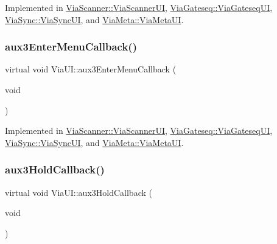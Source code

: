 Implemented in \mbox{\hyperlink{class_via_scanner_1_1_via_scanner_u_i_a7d3aad2399479925618df242bc5b1f42}{Via\+Scanner\+::\+Via\+Scanner\+UI}}, \mbox{\hyperlink{class_via_gateseq_1_1_via_gateseq_u_i_a8e700657f1fe190238eca7c46541337b}{Via\+Gateseq\+::\+Via\+Gateseq\+UI}}, \mbox{\hyperlink{class_via_sync_1_1_via_sync_u_i_a117e57feaf74b2619c1506aacc421721}{Via\+Sync\+::\+Via\+Sync\+UI}}, and \mbox{\hyperlink{class_via_meta_1_1_via_meta_u_i_a2d1e0164ad7d84c410cc90cefe9730ce}{Via\+Meta\+::\+Via\+Meta\+UI}}.

\mbox{\label{class_via_u_i_aa62c9f8dc58d37fc2a3abc7bce1cd16e}} 
\subsubsection{\texorpdfstring{aux3\+Enter\+Menu\+Callback()}{aux3EnterMenuCallback()}}
{\footnotesize\ttfamily virtual void Via\+U\+I\+::aux3\+Enter\+Menu\+Callback (\begin{DoxyParamCaption}\item[{void}]{ }\end{DoxyParamCaption})\hspace{0.3cm}{\ttfamily [pure virtual]}}



Implemented in \mbox{\hyperlink{class_via_scanner_1_1_via_scanner_u_i_ade6dc0e93911fe51731bffa65990599a}{Via\+Scanner\+::\+Via\+Scanner\+UI}}, \mbox{\hyperlink{class_via_gateseq_1_1_via_gateseq_u_i_a8235806bb28a40062b89b1cb9c83e3b0}{Via\+Gateseq\+::\+Via\+Gateseq\+UI}}, \mbox{\hyperlink{class_via_sync_1_1_via_sync_u_i_a66f7a9ccbfff3b1b1ba32fe775808703}{Via\+Sync\+::\+Via\+Sync\+UI}}, and \mbox{\hyperlink{class_via_meta_1_1_via_meta_u_i_a31f9a7e08ee2d77d7aa96b644369e92d}{Via\+Meta\+::\+Via\+Meta\+UI}}.

\mbox{\label{class_via_u_i_a9ea505dfd800b261beabe8dc47b201d3}} 
\subsubsection{\texorpdfstring{aux3\+Hold\+Callback()}{aux3HoldCallback()}}
{\footnotesize\ttfamily virtual void Via\+U\+I\+::aux3\+Hold\+Callback (\begin{DoxyParamCaption}\item[{void}]{ }\end{DoxyParamCaption})\hspace{0.3cm}{\ttfamily [pure virtual]}}



